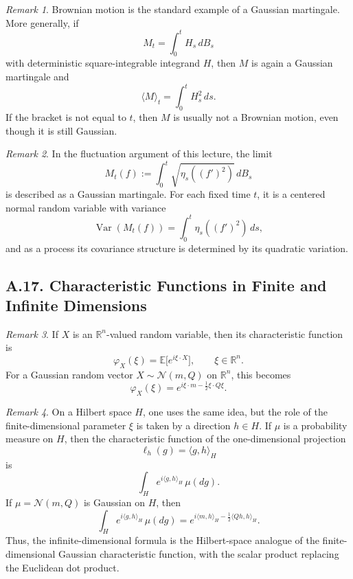 \documentclass[11pt]{article}
\theoremstyle{definition}
\theoremstyle{remark}
\newtheorem{remark}{Remark}
\begin{document}
\begin{remark}
Brownian motion is the standard example of a Gaussian martingale. More generally, if
\[
M_t=\int_0^t H_s\,dB_s
\]
with deterministic square-integrable integrand $H$, then $M$ is again a Gaussian martingale and
\[
\langle M\rangle_t=\int_0^t H_s^2\,ds.
\]
If the bracket is not equal to $t$, then $M$ is usually not a Brownian motion, even though it is still Gaussian.
\end{remark}

\begin{remark}
In the fluctuation argument of this lecture, the limit
\[
M_t(f):=\int_0^t \sqrt{\eta_s((f')^2)}\,dB_s
\]
is described as a Gaussian martingale. For each fixed time $t$, it is a centered normal random variable with variance
\[
\operatorname{Var}(M_t(f))=\int_0^t \eta_s((f')^2)\,ds,
\]
and as a process its covariance structure is determined by its quadratic variation.
\end{remark}

\subsection*{A.17. Characteristic Functions in Finite and Infinite Dimensions}
\begin{remark}
If $X$ is an $\mathbb R^n$-valued random variable, then its characteristic function is
\[
\varphi_X(\xi)=\mathbb E\bigl[e^{i\xi\cdot X}\bigr],
\qquad
\xi\in\mathbb R^n.
\]
For a Gaussian random vector $X\sim \mathcal N(m,Q)$ on $\mathbb R^n$, this becomes
\[
\varphi_X(\xi)=e^{i\xi\cdot m-\frac12 \xi\cdot Q\xi}.
\]
\end{remark}

\begin{remark}
On a Hilbert space $H$, one uses the same idea, but the role of the finite-dimensional parameter $\xi$ is taken by a direction $h\in H$. If $\mu$ is a probability measure on $H$, then the characteristic function of the one-dimensional projection
\[
\ell_h(g)=\langle g,h\rangle_H
\]
is
\[
\int_H e^{i\langle g,h\rangle_H}\,\mu(dg).
\]
If $\mu=\mathcal N(m,Q)$ is Gaussian on $H$, then
\[
\int_H e^{i\langle g,h\rangle_H}\,\mu(dg)
=
e^{i\langle m,h\rangle_H-\frac12\langle Qh,h\rangle_H}.
\]
Thus, the infinite-dimensional formula is the Hilbert-space analogue of the finite-dimensional Gaussian characteristic function, with the scalar product replacing the Euclidean dot product.
\end{remark}
\end{document}
